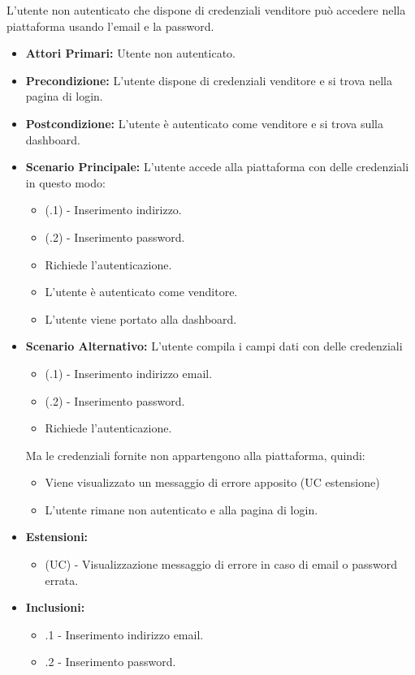 L'utente non autenticato che dispone di credenziali venditore può accedere nella piattaforma usando l'email e la password.
\begin{itemize}
    \item \textbf{Attori Primari:} Utente non autenticato.
    \item \textbf{Precondizione:} L'utente dispone di credenziali venditore e si trova nella pagina di login.
    \item \textbf{Postcondizione:} L'utente è autenticato come venditore e si trova sulla dashboard.
    \item \textbf{Scenario Principale:} L'utente accede alla piattaforma con delle credenziali in questo modo:
    \begin{itemize}
        \item (\actualUC.1) - Inserimento indirizzo.
        \item (\actualUC.2) - Inserimento password.
        \item Richiede l'autenticazione.
        \item L'utente è autenticato come venditore.
        \item L'utente viene portato alla dashboard.
    \end{itemize}
	\item \textbf{Scenario Alternativo:} L'utente compila i campi dati con delle credenziali 
	\begin{itemize}
		\item (\actualUC.1) - Inserimento indirizzo email.
		\item (\actualUC.2) - Inserimento password.
        \item Richiede l'autenticazione.
    \end{itemize}
	Ma le credenziali fornite non appartengono alla piattaforma, quindi:
	\begin{itemize}
		\item Viene visualizzato un messaggio di errore apposito (UC estensione)
		\item L'utente rimane non autenticato e alla pagina di login.
	\end{itemize}
    \item \textbf{Estensioni:}
    \begin{itemize}
        \item (UC) - Visualizzazione messaggio di errore in caso di email o password errata.
    \end{itemize}
    \item \textbf{Inclusioni:}
    \begin{itemize}
    	\item \actualUC.1 - Inserimento indirizzo email.
    	\item \actualUC.2 - Inserimento password. 
    \end{itemize}
\end{itemize}

